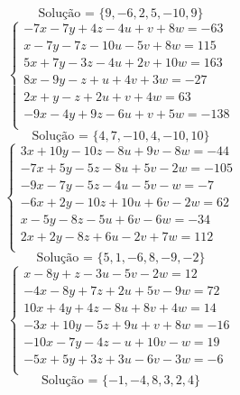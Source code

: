\documentclass[12pt,oneside,a4paper]{article}
\begin{document}
\begin{equation*}
\text{Solução = }\{9,-6,2,5,-10,9\}
\end{equation*}
\vspace{\baselineskip}
\begin{equation*}
\begin{cases}
-7x-7y+4z-4u+v+8w=-63 \\
x-7y-7z-10u-5v+8w=115 \\
5x+7y-3z-4u+2v+10w=163 \\
8x-9y-z+u+4v+3w=-27 \\
2x+y-z+2u+v+4w=63 \\
-9x-4y+9z-6u+v+5w=-138 \\
\end{cases}
\end{equation*}
\begin{equation*}
\text{Solução = }\{4,7,-10,4,-10,10\}
\end{equation*}
\vspace{\baselineskip}
\begin{equation*}
\begin{cases}
3x+10y-10z-8u+9v-8w=-44 \\
-7x+5y-5z-8u+5v-2w=-105 \\
-9x-7y-5z-4u-5v-w=-7 \\
-6x+2y-10z+10u+6v-2w=62 \\
x-5y-8z-5u+6v-6w=-34 \\
2x+2y-8z+6u-2v+7w=112 \\
\end{cases}
\end{equation*}
\begin{equation*}
\text{Solução = }\{5,1,-6,8,-9,-2\}
\end{equation*}
\vspace{\baselineskip}
\begin{equation*}
\begin{cases}
x-8y+z-3u-5v-2w=12 \\
-4x-8y+7z+2u+5v-9w=72 \\
10x+4y+4z-8u+8v+4w=14 \\
-3x+10y-5z+9u+v+8w=-16 \\
-10x-7y-4z-u+10v-w=19 \\
-5x+5y+3z+3u-6v-3w=-6 \\
\end{cases}
\end{equation*}
\begin{equation*}
\text{Solução = }\{-1,-4,8,3,2,4\}
\end{equation*}
\end{document}
